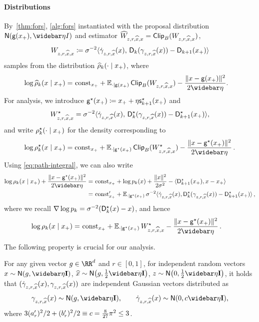 \paragraph{Distributions}
By~\cref{thm:fors}, \cref{alg:fors} instantiated with the proposal distribution $\normal{\gd(x_+),\etabar I}$ and estimator $\widehat W_{z,r,\widehat{x},x} = \mathsf{Clip}_{B}( W_{z,r,\widehat{x},x})$,
\begin{align}\label{eq:def-DM-path-What}
    W_{z,r,\widehat{x},x}\coloneqq \sigma^{-2}\langle \dot\gamma_{z,r,\widehat{x}}(x),\, \mathsf{D}_k(\gamma_{z,r,\widehat{x}}(x)) - \mathsf{D}_{k+1}(x_+)\rangle
\end{align}
samples from the distribution $\widehat{\rho}_k(\cdot\mid x_+)$, where
\begin{align}\label{eq:rhohz}
    \log \rhohat_k(x\mid x_+)=&~\const_{x_+}+\Enxp\pclip{W_{z,r,\xhat,x}}-\frac{\nrm{x-\gd(x_+)}^2}{2\etabar}.
\end{align}
For analysis, we introduce $\mathsf{g}^\star(x_+)\coloneqq x_++\eta\mathsf{s}^\star_{k+1}(x_+)$ and
\begin{align}
    W^\star_{z,r,\widehat{x},x} = \sigma^{-2}\langle \dot\gamma_{z,r,\widehat{x}}(x),\, \mathsf{D}^\star_k(\gamma_{z,r,\widehat{x}}(x)) - \mathsf{D}^\star_{k+1}(x_+)\rangle,
\end{align}
and write $\rho^\star_k(\cdot\mid x_+)$ for the density corresponding to 
\begin{align}\label{eq:rhosz}
    \log \rhostar_k(x\mid x_+)=\const_{x_+}+\Enxps\pclip{\Wstar_{z,r,\xhat,x}}-\frac{\nrm{x-\gds(x_+)}^2}{2\etabar}\,.
\end{align}
Using \cref{eq:path-integral}, we can also write
\begin{align*}
    \log \rho_k(x\mid x_+)+\frac{\nrm{x-\gds(x_+)}^2}{2\etabar}
    =&~\const_{x_+}+ \log p_k(x)+\frac{\nrm{x}^2}{2\sigma^2}-\tri{\Ds_{k+1}(x_+),x-x_+}\\
    =&~ \const_{x_+}'+\Enxps \sigma^{-2}\tri{\dot \gamma_{z,r,\xhat}(x),\Ds_k(\gamma_{z,r,\xhat}(x))-\Ds_{k+1}(x_+)}\,,
\end{align*}
where we recall $\nabla \log p_k=\sigma^{-2}(\mathsf{D}^\star_k(x)-x)$, and hence
\begin{align}
    \log \rho_k(x\mid x_+)=&~\const_{x_+}+\Enxps \Wstar_{z,r,\xhat,x}-\frac{\nrm{x-\gds(x_+)}^2}{2\etabar}\,.
\end{align}


The following property is crucial for our analysis.
\begin{lemma}\label{lem:ind-Gaussian}
For any given vector $g\in \RR^d$ and $r\in[0,1]$, for independent random vectors $x\sim \normal{g, \etabar\Id}$, $\xhat\sim \normal{g,\frac12\etabar\Id}$, $z\sim \normal{0,\frac12\etabar\Id}$, it holds that $(\dot\gamma_{z,r,\widehat{x}}(x),\gamma_{z,r,\widehat{x}}(x))$ are independent Gaussian vectors distributed as
\begin{align*}
    \gamma_{z,r,\xhat}(x)\sim \normal{g,\etabar\Id}, \qquad \dot\gamma_{z,r,\xhat}(x)\sim \normal{0,c\etabar\Id},
\end{align*}
where $3(a_{r}')^2/2+(b_{r}')^2/2\equiv c=\frac{8}{27}\pi^2\leq 3$.
\end{lemma}


